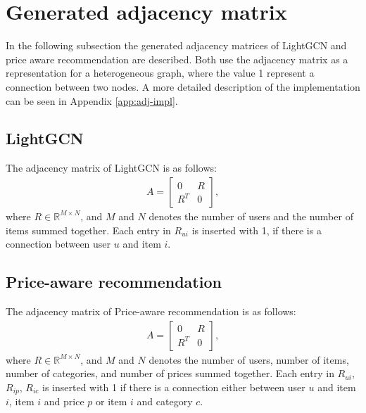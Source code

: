 \section{Generated adjacency matrix}
In the following subsection the generated adjacency matrices of LightGCN and price aware recommendation are described.
Both use the adjacency matrix as a representation for a heterogeneous graph, where the value 1 represent a connection between two nodes.
A more detailed description of the implementation can be seen in Appendix \ref{app:adj-impl}.

\subsection{LightGCN}
The adjacency matrix of LightGCN is as follows:
\begin{gather}
    A =
    \begin{bmatrix}
        0   & R \\
        R^T & 0
    \end{bmatrix},
\end{gather}
where $R \in \mathbb{R}^{M \times N}$, and $M$ and $N$ denotes the number of users and the number of items summed together.
Each entry in $R_{ui}$ is inserted with 1, if there is a connection between user $u$ and item $i$.

\subsection{Price-aware recommendation}
The adjacency matrix of Price-aware recommendation is as follows:
\begin{gather}
    A =
    \begin{bmatrix}
        0   & R \\
        R^T & 0
    \end{bmatrix},
\end{gather}
where $R \in \mathbb{R}^{M \times N}$, and $M$ and $N$ denotes the number of users, number of items, number of categories, and number of prices summed together.
Each entry in $R_{ui}$, $R_{ip}$, $R_{ic}$ is inserted with 1 if there is a connection either between user $u$ and item $i$, item $i$ and price $p$ or item $i$ and category $c$.
